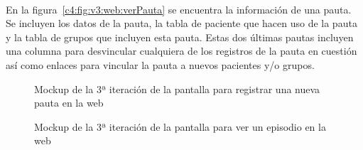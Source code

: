 \paragraph{}
En la figura~\ref{c4:fig:v3:web:verPauta} se encuentra la información de una pauta. Se incluyen los datos de la pauta, la tabla de paciente que hacen uso de la pauta y la tabla de grupos que incluyen esta pauta. Estas dos últimas pautas incluyen una columna para desvincular cualquiera de los registros de la pauta en cuestión así como enlaces para vincular la pauta a nuevos pacientes y/o grupos.

\begin{figure}[H]
    \centering
    \caption[Mockup de la 3ª iteración de la pantalla para registrar una nueva pauta en la web]{Mockup de la 3ª iteración de la pantalla para registrar una nueva pauta en la web}
    \label{c4:fig:v3:web:registrarPauta}
\end{figure}

\begin{figure}[H]
    \centering
    \caption[Mockup de la 3ª iteración de la pantalla para ver un episodio en la web]{Mockup de la 3ª iteración de la pantalla para ver un episodio en la web}
    \label{c4:fig:v3:web:episodio}
\end{figure}

